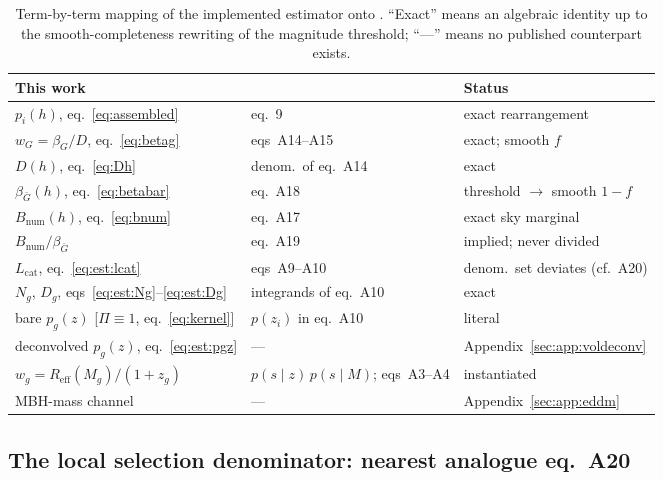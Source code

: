 \begin{table}
  \caption{Term-by-term mapping of the implemented estimator onto
  \citet{Gray:2019ksv}.  ``Exact'' means an algebraic identity up to
  the smooth-completeness rewriting of the magnitude threshold;
  ``---'' means no published counterpart exists.}
  \label{tab:gray:mapping}
  \begin{tabular}{lll}
    \hline
    This work & \citet{Gray:2019ksv} & Status \\
    \hline
    $p_i(h)$, eq.~\eqref{eq:assembled} & eq.~9 & exact rearrangement \\
    $w_G = \beta_G/D$, eq.~\eqref{eq:betag} & eqs~A14--A15 & exact; smooth $f$ \\
    $D(h)$, eq.~\eqref{eq:Dh} & denom.\ of eq.~A14 & exact \\
    $\beta_{\bar G}(h)$, eq.~\eqref{eq:betabar} & eq.~A18 & threshold $\to$ smooth $1-f$ \\
    $B_\mathrm{num}(h)$, eq.~\eqref{eq:bnum} & eq.~A17 & exact sky marginal \\
    $B_\mathrm{num}/\beta_{\bar G}$ & eq.~A19 & implied; never divided \\
    $L_\mathrm{cat}$, eq.~\eqref{eq:est:lcat} & eqs~A9--A10 & denom.\ set deviates (cf.~A20) \\
    $N_g$, $D_g$, eqs~\eqref{eq:est:Ng}--\eqref{eq:est:Dg} & integrands of eq.~A10 & exact \\
    bare $p_g(z)$ [$\Pi \equiv 1$, eq.~\eqref{eq:kernel}] & $p(z_i)$ in eq.~A10 & literal \\
    deconvolved $p_g(z)$, eq.~\eqref{eq:est:pgz} & --- & Appendix~\ref{sec:app:voldeconv} \\
    $w_g = R_\mathrm{eff}(M_g)/(1+z_g)$ & $p(s\mid z)\,p(s\mid M)$; eqs~A3--A4 & instantiated \\
    MBH-mass channel & --- & Appendix~\ref{sec:app:eddm} \\
    \hline
  \end{tabular}
\end{table}

\subsection{The local selection denominator: nearest analogue eq.~A20}
\label{sec:app:gray:local}

